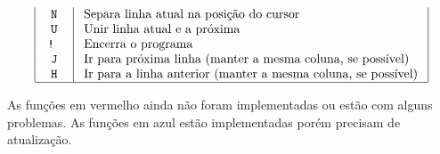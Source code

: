 \documentclass{article}
\begin{document}
$$\begin{array}{|c|l|}
\texttt{ N } & \text { Separa linha atual na posição do cursor } \\
\texttt{ U } & \text { Unir linha atual e a próxima } \\
\texttt{ ! } & \text { Encerra o programa } \\
\texttt{ J } & \text { Ir para próxima linha (manter a mesma coluna, se possível) } \\
\texttt{ H } & \text { Ir para a linha anterior (manter a mesma coluna, se possível) } \\
\hline
\end{array}
$$

As funções em vermelho ainda não foram implementadas ou estão com alguns problemas. As funções em azul estão implementadas porém precisam de atualização.
\end{document}
